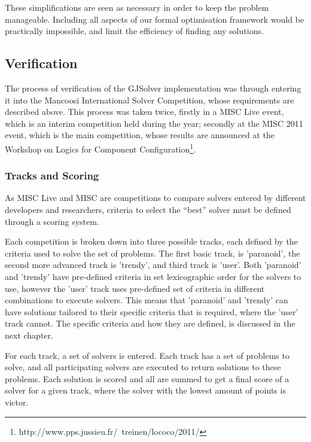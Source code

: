 These simplifications are seen as necessary in order to keep the problem manageable.
Including all aspects of our formal optimisation framework would be practically impossible, and limit the efficiency of finding any solutions.

\subsection{Verification}
\label{impl.verif}
The process of verification of the GJSolver implementation was through entering it into the Mancoosi International Solver Competition, whose requirements are described above.
This process was taken twice, firstly in a MISC Live event, which is an interim competition held during the year;
secondly at the MISC 2011 event, 
which is the main competition, whose results are announced at the Workshop on Logics for Component Configuration\footnote{http://www.pps.jussieu.fr/~treinen/lococo/2011/}.

\subsubsection{Tracks and Scoring}
As MISC Live and MISC are competitions to compare solvers entered by different developers and researchers,
criteria to select the ``best'' solver must be defined through a scoring system.

Each competition is broken down into three possible tracks, each defined by the criteria used to solve the set of problems.
The first basic track, is 'paranoid', the second more advanced track is 'trendy', and third track is 'user'.
Both 'paranoid' and 'trendy' have pre-defined criteria in set lexicographic order for the solvers to use, 
however the 'user' track uses pre-defined set of criteria in different combinations to execute solvers.
This means that 'paranoid' and 'trendy' can have solutions tailored to their specific criteria that is required, where the 'user' track cannot.
The specific criteria and how they are defined, is discussed in the next chapter.

For each track, a set of solvers is entered.
Each track has a set of problems to solve, and all participating solvers are executed to return solutions to these problems.
Each solution is scored and all are summed to get a final score of a solver for a given track, where the solver with the lowest amount of points is victor.

